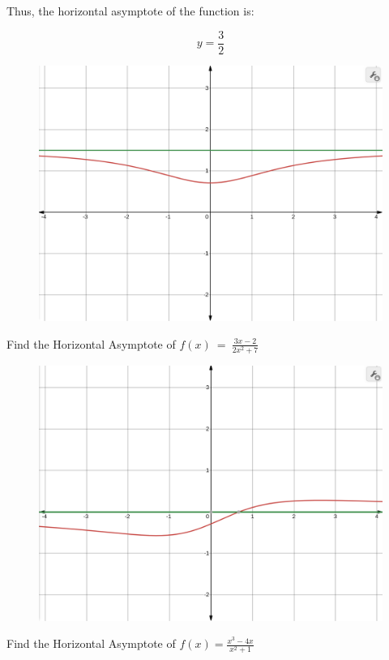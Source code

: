 Thus, the horizontal asymptote of the function is:

\[
y = \frac{3}{2}
\]


\begin{figure}[H]
  \centering
  \includegraphics[scale=0.2]{"./fig/ho_asym1.png"}
\end{figure}

\begin{example}
Find the Horizontal Asymptote of \( f\left(x\right)\ =\ \frac{3x-2}{2x^{2}+7}\)



\begin{figure}[H]
  \centering
  \includegraphics[scale=0.2]{"./fig/ho_asym2.png"}
\end{figure}

\end{example}
\begin{example}
Find the Horizontal Asymptote of \( f(x) = \frac{x^3 - 4x}{x^2 + 1} \)
\end{example}

